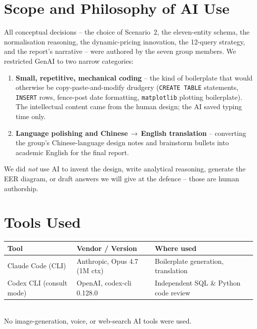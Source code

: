 \documentclass[11pt,a4paper]{article}
\begin{document}
\section{Scope and Philosophy of AI Use}
All conceptual decisions -- the choice of Scenario~2, the eleven-entity
schema, the normalisation reasoning, the dynamic-pricing innovation, the
12-query strategy, and the report's narrative -- were authored by the seven
group members. We restricted GenAI to two narrow categories:

\begin{enumerate}[leftmargin=*,topsep=2pt,itemsep=2pt]
    \item \textbf{Small, repetitive, mechanical coding} -- the kind of
        boilerplate that would otherwise be copy-paste-and-modify drudgery
        (\texttt{CREATE TABLE} statements, \texttt{INSERT} rows,
        fence-post date formatting, \texttt{matplotlib} plotting
        boilerplate). The intellectual content came from the human design;
        the AI saved typing time only.
    \item \textbf{Language polishing and Chinese\,$\rightarrow$\,English
        translation} -- converting the group's Chinese-language design
        notes and brainstorm bullets into academic English for the final
        report.
\end{enumerate}

\noindent We did \emph{not} use AI to invent the design, write analytical
reasoning, generate the EER diagram, or draft answers we will give at the
defence -- those are human authorship.

\section{Tools Used}

\begin{tabularx}{\linewidth}{@{}llX@{}}
\toprule
\textbf{Tool} & \textbf{Vendor / Version} & \textbf{Where used} \\
\midrule
Claude Code (CLI)        & Anthropic, Opus 4.7 (1M ctx)       & Boilerplate generation, translation \\
Codex CLI (consult mode) & OpenAI, codex-cli 0.128.0          & Independent SQL \& Python code review \\
\bottomrule
\end{tabularx}\\[4pt]

\noindent No image-generation, voice, or web-search AI tools were used.
\end{document}
